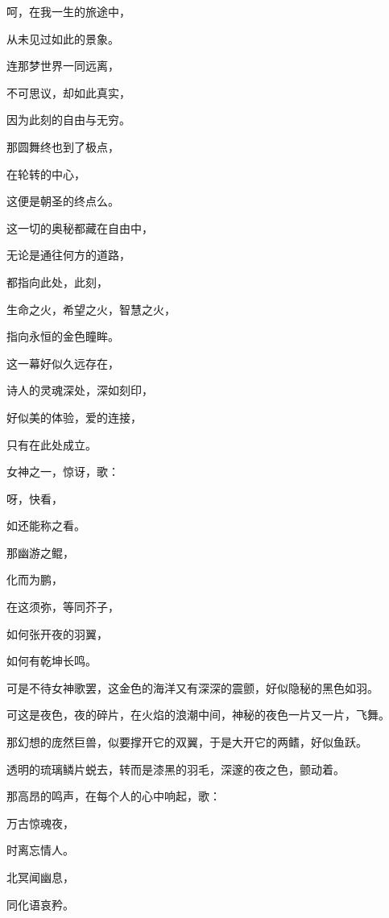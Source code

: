 \documentclass[UTF8]{article}
\begin{document}
\par 呵，在我一生的旅途中，
\par 从未见过如此的景象。
\par 连那梦世界一同远离，
\par 不可思议，却如此真实，
\par 因为此刻的自由与无穷。
\par 那圆舞终也到了极点，
\par 在轮转的中心，
\par 这便是朝圣的终点么。
\par 这一切的奥秘都藏在自由中，
\par 无论是通往何方的道路，
\par 都指向此处，此刻，
\par 生命之火，希望之火，智慧之火，
\par 指向永恒的金色瞳眸。
\par 这一幕好似久远存在，
\par 诗人的灵魂深处，深如刻印，
\par 好似美的体验，爱的连接，
\par 只有在此处成立。
\\[0.6cm]
\par 女神之一，惊讶，歌：
\\[0.6cm]
\par 呀，快看，
\par 如还能称之看。
\par 那幽游之鲲，
\par 化而为鹏，
\par 在这须弥，等同芥子，
\par 如何张开夜的羽翼，
\par 如何有乾坤长鸣。
\\[0.6cm]
\par 可是不待女神歌罢，这金色的海洋又有深深的震颤，好似隐秘的黑色如羽。
\par 可这是夜色，夜的碎片，在火焰的浪潮中间，神秘的夜色一片又一片，飞舞。
\par 那幻想的庞然巨兽，似要撑开它的双翼，于是大开它的两鳍，好似鱼跃。
\par 透明的琉璃鳞片蜕去，转而是漆黑的羽毛，深邃的夜之色，颤动着。
\\[0.6cm]
\par 那高昂的鸣声，在每个人的心中响起，歌：
\\[0.6cm]
\par 万古惊魂夜，
\par 时离忘情人。
\par 北冥闻幽息，
\par 同化语哀矜。
\end{document}
